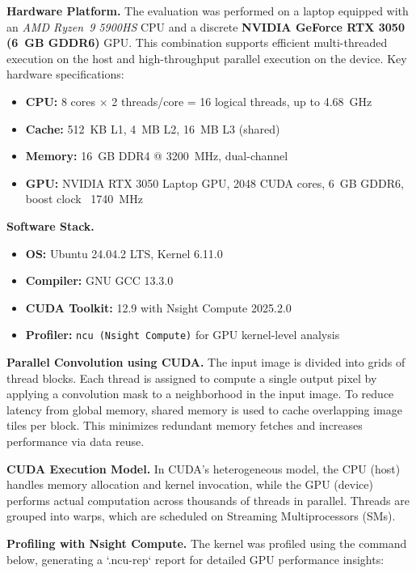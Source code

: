 \documentclass[conference, 10pt]{IEEEtran}
\begin{document}
\textbf{Hardware Platform.} 
The evaluation was performed on a laptop equipped with an \textit{AMD Ryzen\texttrademark~9 5900HS} CPU and a discrete \textbf{NVIDIA GeForce RTX 3050 (6~GB GDDR6)} GPU. This combination supports efficient multi-threaded execution on the host and high-throughput parallel execution on the device. Key hardware specifications:

\begin{itemize}
    \item \textbf{CPU:} 8 cores $\times$ 2 threads/core = 16 logical threads, up to 4.68~GHz
    \item \textbf{Cache:} 512~KB L1, 4~MB L2, 16~MB L3 (shared)
    \item \textbf{Memory:} 16~GB DDR4 @ 3200~MHz, dual-channel
    \item \textbf{GPU:} NVIDIA RTX 3050 Laptop GPU, 2048 CUDA cores, 6~GB GDDR6, boost clock ~1740~MHz
\end{itemize}

\textbf{Software Stack.}
\begin{itemize}
    \item \textbf{OS:} Ubuntu 24.04.2 LTS, Kernel 6.11.0
    \item \textbf{Compiler:} GNU GCC 13.3.0
    \item \textbf{CUDA Toolkit:} 12.9 with Nsight Compute 2025.2.0
    \item \textbf{Profiler:} \texttt{ncu (Nsight Compute)} for GPU kernel-level analysis
\end{itemize}

\textbf{Parallel Convolution using CUDA.}  
The input image is divided into grids of thread blocks. Each thread is assigned to compute a single output pixel by applying a convolution mask to a neighborhood in the input image. To reduce latency from global memory, shared memory is used to cache overlapping image tiles per block. This minimizes redundant memory fetches and increases performance via data reuse.

\textbf{CUDA Execution Model.}  
In CUDA's heterogeneous model, the CPU (host) handles memory allocation and kernel invocation, while the GPU (device) performs actual computation across thousands of threads in parallel. Threads are grouped into warps, which are scheduled on Streaming Multiprocessors (SMs).

\textbf{Profiling with Nsight Compute.}  
The kernel was profiled using the command below, generating a `.ncu-rep` report for detailed GPU performance insights:
\end{document}
